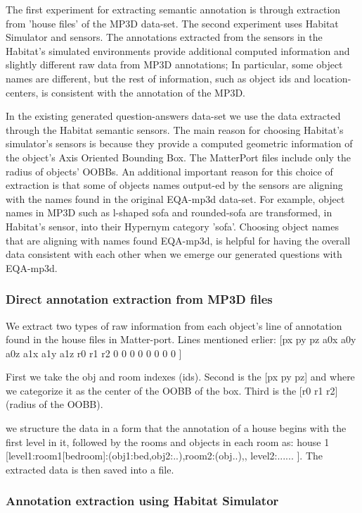 The first experiment for extracting semantic annotation is through extraction from 'house files' of the MP3D data-set. The second experiment uses Habitat Simulator and sensors. The annotations extracted from the sensors in the Habitat's simulated environments provide additional computed information and slightly different raw data from MP3D annotations; In particular, some object names are different, but the rest of information, such as object ids and location-centers, is consistent with the annotation of the MP3D. 

In the existing generated question-answers data-set we use the data extracted through the Habitat semantic sensors. The main reason for choosing Habitat's simulator's sensors is because they provide a computed geometric information of the object's Axis Oriented Bounding Box. The MatterPort files include only the radius of objects' OOBBs.  An additional important reason for this choice of extraction is that some of  objects names output-ed by the sensors are aligning with the names found in the original EQA-mp3d data-set. For example, object names in MP3D such as l-shaped sofa and rounded-sofa are transformed, in Habitat's sensor, into their Hypernym category 'sofa'. Choosing object names that are aligning with names found EQA-mp3d, is helpful for having the overall data consistent with each other when we emerge our generated questions with EQA-mp3d. 



\subsubsection{Direct annotation extraction from MP3D files}


We extract two types of raw information from each object's line of annotation found in the house files in Matter-port. Lines mentioned erlier: [px py pz  a0x a0y a0z  a1x a1y a1z  r0 r1 r2 0 0 0 0 0 0 0 0 ] 

First we take the obj and room indexes (ids). Second is the [px py pz] and where we categorize it as the center of the OOBB of the box. Third is the [r0 r1 r2] (radius of the OOBB).

we structure the data in a form that the annotation of a house begins with the first level in it, followed by the rooms and objects in each room as: house 1 [{level1:room1[bedroom]:(obj1:bed,obj2:..),room2:(obj..)},, {level2:......} ]. The extracted data is then saved into a file. 

\subsubsection{Annotation extraction using Habitat Simulator}

